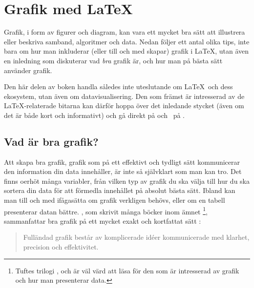 \documentclass[10pt,../../a4.tex]{subfiles}
\begin{document}
\chapter{Grafik med \LaTeX}\label{sec:4}
\vspace*{-0.75\baselineskip}%
Grafik, i form av figurer och diagram, kan vara ett mycket bra sätt
att illustrera eller beskriva samband, algoritmer och data. Nedan följer
ett antal olika tips, inte bara om hur man inkluderar (eller till och 
med skapar) grafik i \LaTeX, utan även en inledning som diskuterar vad
\emph{bra} grafik är, och hur man på bästa sätt använder grafik.

Den här delen av boken handla således inte uteslutande om \LaTeX\ och
dess ekosystem, utan även om datavisualisering. Den som främst är
intresserad av de \LaTeX-relaterade bitarna kan därför hoppa över
det inledande stycket (även om det är både kort och informativt) och
gå direkt på  och \PGFTikZ\ på
.

\vspace*{-0.75\baselineskip}%
\section{Vad är bra grafik?}
\vspace*{-0.25\baselineskip}%
Att skapa bra grafik, grafik som på ett effektivt och tydligt sätt
kommunicerar den information din data innehåller, är inte så självklart
som man kan tro. Det finns oerhöt många variabler, från vilken typ av
grafik du ska välja \parencite{Henry12} till hur du ska sortera din
data \parencites{Camoes10}[\pno~178]{Tufte01} för att förmedla innehållet
på absolut bästa sätt. Ibland kan man till och med ifågasätta om grafik
verkligen behövs, eller om en tabell presenterar datan bättre.
, som skrivit många böcker inom ämnet%
\footnote{Tuftes trilogi \emph{} \parencite{Tufte01},
	\emph{} \parencite{Tufte90} och
	\emph{} \parencite{Tufte97} är väl värd att läsa
	för den som är intresserad av grafik och hur man presenterar data.},
sammanfattar bra grafik på ett mycket exakt och kortfattat sätt
\textcite[\pno~51]{Tufte01}:%
\begin{quotation}
	Fulländad grafik består av komplicerade idéer kommunicerade med
	klarhet, precision och effektivitet.
\end{quotation}
\end{document}

